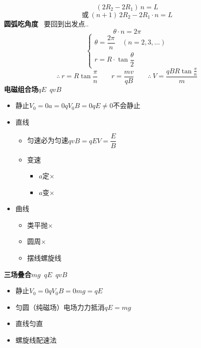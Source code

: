 \[ (2R_2-2R_1)\,n=L \]
\[ \text{或}\ (n+1)\,2R_2-2R_1\cdot n=L \]
\textbf{圆弧吃角度}\ 
要回到出发点..
\[ \theta\cdot n=2\pi \]
\[ \begin{cases}\theta=\dfrac{2\pi}{n}\quad(n=2,3,\dots)\\[1ex] r=R\cdot\tan\dfrac{\theta}{2}\end{cases} \]
\[ \therefore\ r=R\tan\frac{\pi}{n}\qquad r=\frac{mv}{qB}\qquad \therefore\ V=\frac{qBR\tan\frac{\pi}{n}}{m} \]
\textbf{电磁组合场}\quad $qE$\ $qvB$
\begin{itemize}
\item 静止\quad $V_0=0$\quad $a=0$\quad $qV_0B=0$\quad $qE\ne0$\quad 不会静止
\item 直线
  \begin{itemize}
  \item 匀速\quad 必为匀速\quad $qvB=qE$\quad $V=\dfrac{E}{B}$
  \item 变速
    \begin{itemize}
    \item $a$定\quad $\times$
    \item $a$变\quad $\times$
    \end{itemize}
  \end{itemize}
\item 曲线
  \begin{itemize}
  \item 类平抛\quad $\times$
  \item 圆周\quad $\times$
  \item 摆线\quad 螺旋线
  \end{itemize}
\end{itemize}
\textbf{三场叠合}\quad $mg$\ $qE$\ $qvB$
\begin{itemize}
\item 静止\quad $V_0=0$\quad $qV_0B=0$\quad $mg=qE$
\item 匀圆（纯磁场）\quad 电场力力抵消\quad $qE=mg$
\item 直线\quad 匀直
\item 螺旋线\quad 配速法
\end{itemize}
